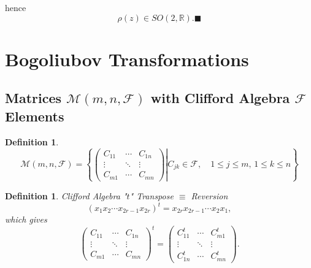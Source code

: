 \documentclass[aps,preprint]{revtex4}
\newtheorem{definition}[theorem]{Definition}
\begin{document}
hence 
\begin{equation}
\rho \left( z\right) \in SO\left( 2,\mathbb{R}\right) .\blacksquare
\end{equation}

\section{Bogoliubov Transformations}

\subsection{Matrices $\mathcal{M}\left( m,n,\mathcal{F}\right) $ with
Clifford Algebra $\mathcal{F}$ Elements}

\begin{definition}
\begin{equation}
\mathcal{M}\left( m,n,\mathcal{F}\right) =\left\{ \left. \left( 
\begin{array}{ccc}
C_{11} & \cdots & C_{1n} \\ 
\vdots & \ddots & \vdots \\ 
C_{m1} & \cdots & C_{mn}%
\end{array}%
\right) \right\vert C_{jk}\in \mathcal{F},\quad 1\leq j\leq m,\,1\leq k\leq
n\right\}
\end{equation}
\end{definition}

\begin{definition}
Clifford Algebra "$t$" Transpose $\equiv $ Reversion 
\begin{equation}
\left( x_{1}x_{2}\cdots x_{2r-1}x_{2r}\right) ^{t}=x_{2r}x_{2r-1}\cdots
x_{2}x_{1},
\end{equation}%
which gives 
\begin{equation}
\left( 
\begin{array}{ccc}
C_{11} & \cdots & C_{1n} \\ 
\vdots & \ddots & \vdots \\ 
C_{m1} & \cdots & C_{mn}%
\end{array}%
\right) ^{t}=\left( 
\begin{array}{ccc}
C_{11}^{t} & \cdots & C_{m1}^{t} \\ 
\vdots & \ddots & \vdots \\ 
C_{1n}^{t} & \cdots & C_{mn}^{t}%
\end{array}%
\right) .
\end{equation}
\end{definition}
\end{document}
